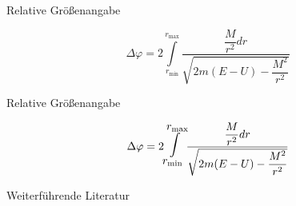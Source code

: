 \documentclass[
	vorläufig=false,
	datum=2018-11-12,
	titel={Mathematiksatz II},
	web=true,
	max,
	aspectratio=1610,
]{../tex/latexkurs-slides}
\begin{document}
\begin{frame}[fragile]{Relative Größenangabe}
\begin{LTXexample}[pos=b]
\[\Delta \varphi = 2
\int\limits_{r_{\min}}^{r_{\max}} \frac{ \dfrac{M}{r^2} dr} 
{\sqrt{2m (E-U) - \dfrac{M^2}{r^2}}}
\]
\end{LTXexample}
\end{frame}

\begin{frame}[fragile]{Relative Größenangabe}
\begin{LTXexample}[pos=b]
\newcommand\largeint{\mathlarger{\mathlarger{\mathlarger{\int}}}}
\[\Delta \varphi = 2
\largeint\limits_{r_{\min}}^{r_{\max}} \frac{ \dfrac{M}{r^2} dr} 
{\sqrt{2m (E-U) - \dfrac{M^2}{r^2}}}
\]
\end{LTXexample}
\end{frame}

\nocite{wikibooksmaths,amsthm, siunitx, gnuplottex, mathmode}
\begin{frame}[allowframebreaks]{Weiterführende Literatur}
\printbibliography
\end{frame}


\end{document}
